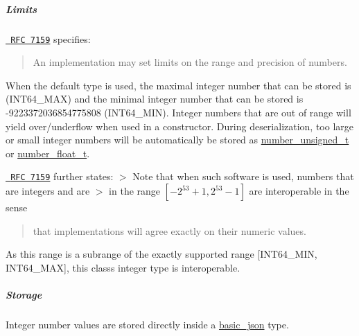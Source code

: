 \subparagraph*{Limits}

\href{http://rfc7159.net/rfc7159}{\texttt{ R\+FC 7159}} specifies\+: \begin{quote}
An implementation may set limits on the range and precision of numbers. \end{quote}


When the default type is used, the maximal integer number that can be stored is {} (I\+N\+T64\+\_\+\+M\+AX) and the minimal integer number that can be stored is {\ttfamily -\/9223372036854775808} (I\+N\+T64\+\_\+\+M\+IN). Integer numbers that are out of range will yield over/underflow when used in a constructor. During deserialization, too large or small integer numbers will be automatically be stored as \mbox{\hyperlink{classnlohmann_1_1basic__json_ab906e29b5d83ac162e823ada2156b989}{number\+\_\+unsigned\+\_\+t}} or \mbox{\hyperlink{classnlohmann_1_1basic__json_a88d6103cb3620410b35200ee8e313d97}{number\+\_\+float\+\_\+t}}.

\href{http://rfc7159.net/rfc7159}{\texttt{ R\+FC 7159}} further states\+: $>$ Note that when such software is used, numbers that are integers and are $>$ in the range $[-2^{53}+1, 2^{53}-1]$ are interoperable in the sense \begin{quote}
that implementations will agree exactly on their numeric values. \end{quote}


As this range is a subrange of the exactly supported range \mbox{[}I\+N\+T64\+\_\+\+M\+IN, I\+N\+T64\+\_\+\+M\+AX\mbox{]}, this class\textquotesingle{}s integer type is interoperable.

\subparagraph*{Storage}

Integer number values are stored directly inside a \mbox{\hyperlink{classnlohmann_1_1basic__json}{basic\+\_\+json}} type.


